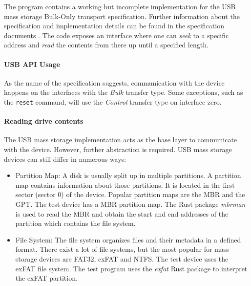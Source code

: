 The program contains a working but incomplete implementation for the \acrshort{USB} mass storage Bulk-Only transport specification. Further information about the specification and implementation details can be found in the specification documents \cite{usb_specification_boot} \cite{usb_specification_bulk}. The code exposes an interface where one can \textit{seek} to a specific address and \textit{read} the contents from there up until a specified length.

\paragraph{\acrshort{USB} \acrshort{API} Usage}
As the name of the specification suggests, communication with the device happens on the interfaces with the \textit{Bulk} transfer type. Some exceptions, such as the \texttt{reset} command, will use the \textit{Control} transfer type on interface zero.

\paragraph{Reading drive contents}
The \acrshort{USB} mass storage implementation acts as the base layer to communicate with the device. However, further abstraction is required. USB mass storage devices can still differ in numerous ways:

\begin{itemize}
\item Partition Map: A disk is usually split up in multiple partitions. A partition map contains information about those partitions. It is located in the first sector (sector 0) of the device. Popular partition maps are the \acrfull{MBR} and the \acrfull{GPT}. The test device has a \acrfull{MBR} partition map. The Rust package \textit{mbrman} \cite{mbrman} is used to read the \acrshort{MBR} and obtain the start and end addresses of the partition which contains the file system.

\item File System: The file system organizes files and their metadata in a defined format. There exist a lot of file systems, but the most popular for mass storage devices are \acrfull{FAT32}, \acrfull{exFAT} and \acrfull{NTFS}. The test device uses the \acrshort{exFAT} file system. The test program uses the \textit{exfat} \cite{exfat_package} Rust package to interpret the \acrshort{exFAT} partition.
\end{itemize}


